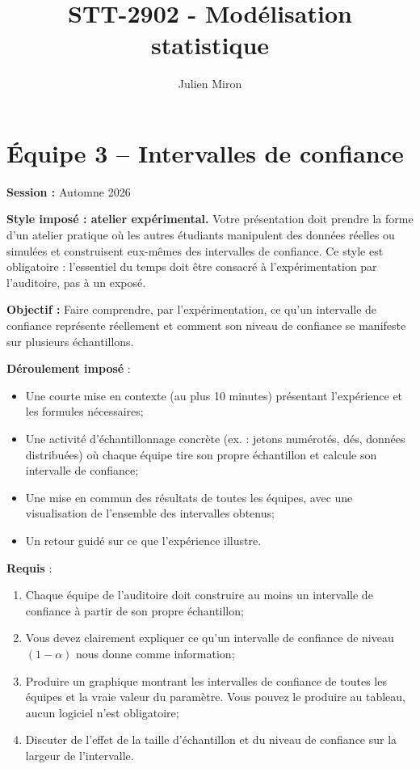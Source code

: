 \documentclass{article}
\title{STT-2902 - Modélisation statistique}
\author{Julien Miron}
\begin{document}
\section*{Équipe 3 – Intervalles de confiance}

\textbf{Session :} Automne 2026

\textbf{Style imposé : atelier expérimental.} Votre présentation doit prendre la forme d'un atelier pratique où les autres étudiants manipulent des données réelles ou simulées et construisent eux-mêmes des intervalles de confiance. Ce style est obligatoire : l'essentiel du temps doit être consacré à l'expérimentation par l'auditoire, pas à un exposé.

\vspace{0.5cm}
\textbf{Objectif :} Faire comprendre, par l'expérimentation, ce qu'un intervalle de confiance représente réellement et comment son niveau de confiance se manifeste sur plusieurs échantillons.

\vspace{0.5cm}
\textbf{Déroulement imposé} :
\begin{itemize}
    \item Une courte mise en contexte (au plus 10 minutes) présentant l'expérience et les formules nécessaires;
    \item Une activité d'échantillonnage concrète (ex. : jetons numérotés, dés, données distribuées) où chaque équipe tire son propre échantillon et calcule son intervalle de confiance;
    \item Une mise en commun des résultats de toutes les équipes, avec une visualisation de l'ensemble des intervalles obtenus;
    \item Un retour guidé sur ce que l'expérience illustre.
\end{itemize}

\vspace{0.5cm}
\textbf{Requis} :
\begin{enumerate}
    \item Chaque équipe de l'auditoire doit construire au moins un intervalle de confiance à partir de son propre échantillon;
    \item Vous devez clairement expliquer ce qu'un intervalle de confiance de niveau $(1-\alpha)$ nous donne comme information;
    \item Produire un graphique montrant les intervalles de confiance de toutes les équipes et la vraie valeur du paramètre. Vous pouvez le produire au tableau, aucun logiciel n'est obligatoire;
    \item Discuter de l'effet de la taille d'échantillon et du niveau de confiance sur la largeur de l'intervalle.
\end{enumerate}
\end{document}

